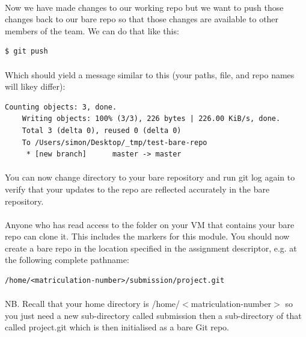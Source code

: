 \documentclass[12pt, a4paper, oneside]{book}
\begin{document}
\paragraph{} Now we have made changes to our working repo but we want to push those changes back to our bare repo so that those changes are available to other members of the team. We can do that like this:

\begin{lstlisting}[style=DOS]
    $ git push
\end{lstlisting}

\paragraph{} Which should yield a message similar to this (your paths, file, and repo names will likey differ):

\begin{lstlisting}[style=DOS]
    Counting objects: 3, done.
    Writing objects: 100% (3/3), 226 bytes | 226.00 KiB/s, done.
    Total 3 (delta 0), reused 0 (delta 0)
    To /Users/simon/Desktop/_tmp/test-bare-repo
     * [new branch]      master -> master
\end{lstlisting}

\paragraph{} You can now change directory to your bare repository and run git log again to verify that your updates to the repo are reflected accurately in the bare repository.

\paragraph{} Anyone who has read access to the folder on your VM that contains your bare repo can clone it. This includes the markers for this module. You should now create a bare repo in the location specified in the assignment descriptor, e.g. at the following complete pathname:

\begin{lstlisting}[style=DOS]
    /home/<matriculation-number>/submission/project.git
\end{lstlisting}

\paragraph{} NB. Recall that your home directory is /home/$<$matriculation-number$>$ so you just need a new sub-directory called submission then a sub-directory of that called project.git which is then initialised as a bare Git repo.
\end{document}
